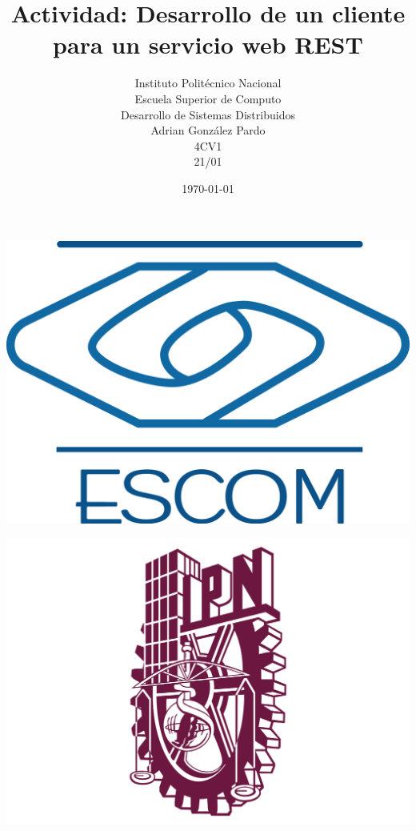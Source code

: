 \documentclass[10pt,executivepaper]{article}
\title{Actividad: Desarrollo de un cliente para un servicio web REST}
\author{Instituto Politécnico Nacional\\Escuela Superior de Computo\\Desarrollo de Sistemas Distribuidos\\Adrian González Pardo\\4CV1\\21/01}
\date{\today}
\begin{document}
\begin{minipage}{0.4\textwidth}
	\begin{flushleft}
		\includegraphics[scale = 0.05]{logoescom.png}
	\end{flushleft}
\end{minipage}
\begin{minipage}{0.51\textwidth}
	\begin{flushright}
		\includegraphics[scale = 0.055]{logoipn.png}
	\end{flushright}
\end{minipage}
\end{document}
